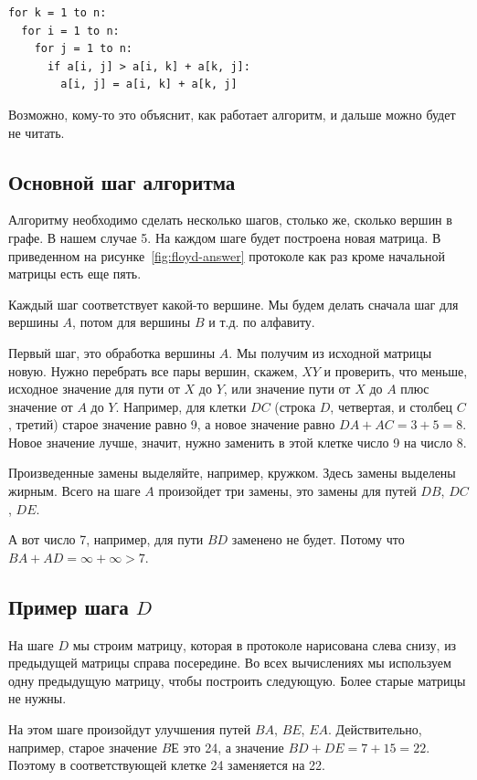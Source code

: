\documentclass{article}
\begin{document}
\begin{verbatim}
for k = 1 to n:
  for i = 1 to n:
    for j = 1 to n:
      if a[i, j] > a[i, k] + a[k, j]:
        a[i, j] = a[i, k] + a[k, j]
\end{verbatim}

Возможно, кому-то это объяснит, как работает алгоритм, и дальше можно будет не читать.

\subsection{Основной шаг алгоритма}

Алгоритму необходимо сделать несколько шагов, столько же, сколько вершин в графе. В нашем случае 5. На каждом шаге будет построена новая матрица. В приведенном на рисунке~\ref{fig:floyd-answer} протоколе как раз кроме начальной матрицы есть еще пять.

Каждый шаг соответствует какой-то вершине. Мы будем делать сначала шаг для вершины $A$, потом для вершины $B$ и т.д. по алфавиту.

Первый шаг, это обработка вершины $A$. Мы получим из исходной матрицы новую. Нужно перебрать все пары вершин, скажем, $XY$ и проверить, что меньше, исходное значение для пути от $X$ до $Y$, или значение пути от $X$ до $A$ плюс значение от $A$ до $Y$. Например, для клетки $DC$ (строка $D$, четвертая, и столбец $C$, третий) старое значение равно 9, а новое значение равно $DA + AC = 3 + 5 = 8$. Новое значение лучше, значит, нужно заменить в этой клетке число 9 на число 8.

Произведенные замены выделяйте, например, кружком. Здесь замены выделены жирным. Всего на шаге $A$ произойдет три замены, это замены для путей $DB$, $DC$, $DE$.

А вот число 7, например, для пути $BD$ заменено не будет. Потому что $BA + AD = \infty + \infty > 7$.

\subsection{Пример шага $D$}

На шаге $D$ мы строим матрицу, которая в протоколе нарисована слева снизу, из предыдущей матрицы справа посередине. Во всех вычислениях мы используем одну предыдущую матрицу, чтобы построить следующую. Более старые матрицы не нужны.

На этом шаге произойдут улучшения путей $BA$, $BE$, $EA$. Действительно, например, старое значение $BЕ$ это 24, а значение $BD + DE = 7 + 15 = 22$. Поэтому в соответствующей клетке 24 заменяется на 22.
\end{document}
